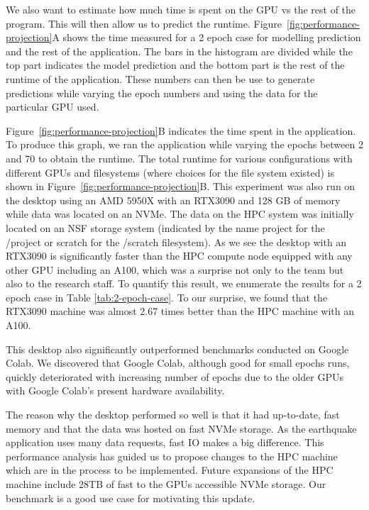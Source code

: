 \documentclass[utf8]{FrontiersinVancouver} %
\begin{document}
We also want to estimate how much time is spent on the GPU vs the rest of the program. This will then allow us to predict the runtime.
Figure~\ref{fig:performance-projection}A shows the time measured for a
2 epoch case for modelling prediction and the rest of the application. The bars in the histogram are divided while the top part indicates the model prediction and the bottom part is the rest of the runtime of the application. These numbers can then be use to generate predictions while varying the epoch numbers and using the data for the particular GPU used.

Figure~\ref{fig:performance-projection}B indicates the time spent in the application.  To produce this graph, we ran the application  while varying the epochs between 2 and 70 to obtain the
runtime.  The total runtime for various configurations with different GPUs and filesystems (where choices for the file system existed) is shown in
Figure~\ref{fig:performance-projection}B. 
This experiment was also
run on the desktop using an AMD 5950X with an RTX3090 and 128 GB of
memory while data was located on an NVMe. The data on the HPC system
was initially located on an NSF storage system (indicated by the name project for the /project or scratch for the /scratch filesystem).  As we see the desktop with an RTX3090 is significantly faster than the HPC compute node
equipped with any other GPU including an A100, which was a surprise not only to the team but also to the research staff. To quantify this result, we enumerate the
results for a 2 epoch case in Table \ref{tab:2-epoch-case}.  To our
surprise, we found that the RTX3090 machine was almost 2.67 times
better than the HPC machine with an A100.

This desktop also significantly outperformed benchmarks conducted on Google Colab. We discovered that Google Colab, although
good for small epochs runs, quickly deteriorated with increasing
number of epochs due to the older GPUs with Google Colab's present hardware availability.

The reason why the desktop performed so well is that it had up-to-date,
fast memory and that the data was hosted on fast NVMe storage. As the
earthquake application uses many data requests, fast IO makes a big
difference. This performance analysis has guided us to propose changes to the HPC
machine which are in the process to be implemented. Future expansions of the HPC machine include 28TB of fast to
the GPUs accessible NVMe storage. Our benchmark is a good use case for motivating this update.
\end{document}
